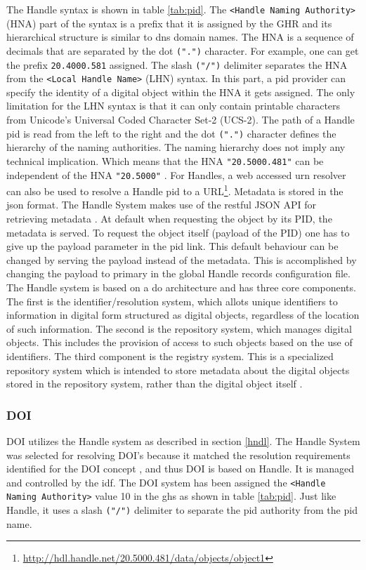 The Handle syntax is shown in table \ref{tab:pid}. The \texttt{\textless Handle Naming Authority\textgreater} (HNA) part of the syntax is a prefix that it is assigned by the GHR and its hierarchical structure is similar to \gls{dns} domain names. The HNA is a sequence of decimals that are separated by the dot \texttt{(".")} character. For example, one can get the prefix \texttt{20.4000.581} assigned. The slash \texttt{("/")} delimiter separates the HNA from the \texttt{\textless Local Handle Name\textgreater} (LHN) syntax. In this part, a \gls{pid} provider can specify the identity of a digital object within the HNA it gets assigned. The only limitation for the LHN syntax is that it can only contain printable characters from Unicode's Universal Coded Character Set-2 (UCS-2). The path of a Handle \gls{pid} is read from the left to the right and the dot \texttt{(".")} character defines the hierarchy of the naming authorities. The naming hierarchy does not imply any technical implication. Which means that the HNA \texttt{"20.5000.481"} can be independent of the HNA \texttt{"20.5000"} \cite{icn-bd}. For Handles, a web accessed \gls{urn} resolver can also be used to resolve a Handle \gls{pid} to a URL\footnote{\url{http://hdl.handle.net/20.5000.481/data/objects/object1}}. Metadata is stored in the \gls{json} format. %
The Handle System makes use of the restful JSON API for retrieving metadata \cite{hdl-api}. At default when requesting the object by its PID, the metadata is served. To request the object itself (payload of the PID) one has to give up the payload parameter in the \gls{pid} link. This default behaviour can be changed by serving the payload instead of the metadata. This is accomplished by changing the payload to primary in the global Handle records configuration file.
The Handle system is based on a \gls{do} architecture and has three core components. The first is the identifier/resolution system, which allots unique identifiers to information in digital form structured as digital objects, regardless of the location of such information. The second is the repository system, which manages digital objects. This includes the provision of access to such objects based on the use of identifiers. The third component is the registry system. This is a specialized repository system which is intended to store metadata about the digital objects stored in the repository system, rather than the digital object itself \cite{dona-1}.

\subsubsection{DOI}\label{doi}
DOI utilizes the Handle system as described in section \ref{hndl}. The Handle System was selected for resolving DOI's because it matched the resolution requirements identified for the DOI concept \cite{doi-found}, and thus DOI is based on Handle. It is managed and controlled by the \gls{idf}. The DOI system has been assigned the \texttt{<Handle Naming Authority>} value 10 in the \gls{ghs} as shown in table \ref{tab:pid}. Just like Handle, it uses a slash \texttt{("/")} delimiter to separate the \gls{pid} authority from the \gls{pid} name.

